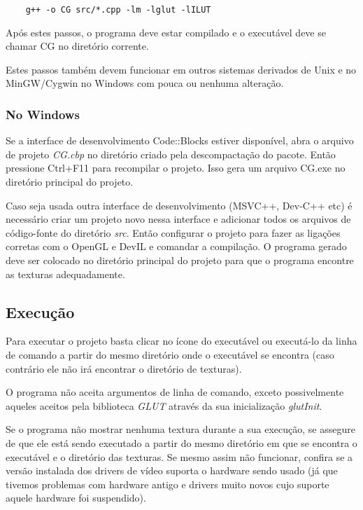 \documentclass[a4paper,10pt]{article}
\begin{document}
\begin{verbatim}
	g++ -o CG src/*.cpp -lm -lglut -lILUT
\end{verbatim}

Após estes passos, o programa deve estar compilado e o executável deve se chamar CG no diretório corrente.

Estes passos também devem funcionar em outros sistemas derivados de Unix e no MinGW/Cygwin no Windows com pouca ou nenhuma alteração.


\subsubsection{No Windows}

Se a interface de desenvolvimento Code::Blocks estiver disponível, abra o arquivo de projeto \emph{CG.cbp} no diretório criado pela descompactação do pacote. Então pressione Ctrl+F11 para recompilar o projeto. Isso gera um arquivo CG.exe no diretório principal do projeto.

Caso seja usada outra interface de desenvolvimento (MSVC++, Dev-C++ etc) é necessário criar um projeto novo nessa interface e adicionar todos os arquivos de código-fonte do diretório \emph{src}. Então configurar o projeto para fazer as ligações corretas com o OpenGL e DevIL e comandar a compilação. O programa gerado deve ser colocado no diretório principal do projeto para que o programa encontre as texturas adequadamente.


\subsection{Execução}

Para executar o projeto basta clicar no ícone do executável ou executá-lo da linha de comando a partir do mesmo diretório onde o executável se encontra (caso contrário ele não irá encontrar o diretório de texturas).

O programa não aceita argumentos de linha de comando, exceto possivelmente aqueles aceitos pela biblioteca \emph{GLUT} através da sua inicialização \emph{glutInit}.

Se o programa não mostrar nenhuma textura durante a sua execução, se assegure de que ele está sendo executado a partir do mesmo diretório em que se encontra o executável e o diretório das texturas. Se mesmo assim não funcionar, confira se a versão instalada dos drivers de vídeo suporta o hardware sendo usado (já que tivemos problemas com hardware antigo e drivers muito novos cujo suporte aquele hardware foi suspendido).
\end{document}
